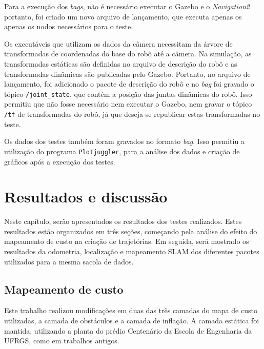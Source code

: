 \documentclass[repeatfields,xlists,xpacks,oneside,yearsonly]{ufrgscca}
\begin{document}



Para a execução dos \textit{bags}, não é necessário executar o Gazebo e o
\textit{Navigation2} portanto, foi criado um novo arquivo de lançamento,
que executa apenas os apenas os nodos necessários para o teste.

Os executáveis que utilizam os dados da câmera necessitam da árvore de
transformadas de coordenadas do base do robô até a câmera.
Na simulação, as transformadas estáticas são definidas no arquivo de descrição
do robô e as transformadas dinâmicas são publicadas pelo Gazebo.
Portanto, no arquivo de lançamento, foi adicionado o pacote
de descrição do robô e no \textit{bag} foi gravado o tópico
\texttt{/joint\_state}, que contém a posição das juntas dinâmicas do robô.
Isso permitiu que não fosse necessário nem executar o Gazebo, nem gravar
o tópico \texttt{/tf} de transformadas do robô, já que deseja-se republicar
estas transformadas no teste.

Os dados dos testes também foram gravados no formato \textit{bag}.
Isso permitiu a utilização do programa
\texttt{Plotjuggler}, para a análise
dos dados e criação de gráficos após a execução dos testes.

\chapter{Resultados e discussão}
\label{resultados}

Neste capítulo, serão apresentados os resultados dos testes realizados.
Estes resultados estão organizados em três seções, começando pela análise
do efeito do mapeamento de custo na criação de trajetórias.
Em seguida, será mostrado os resultados da odometria, localização e mapeamento
SLAM dos diferentes pacotes utilizados para a mesma sacola de dados.


\section{Mapeamento de custo}

Este trabalho realizou modificações em duas das três camadas do mapa de custo
utilizadas, a camada de obstáculos e a camada de inflação.
A camada estática foi mantida, utilizando a planta do prédio Centenário da
Escola de Engenharia da UFRGS, como em trabalhos antigos.
\end{document}
